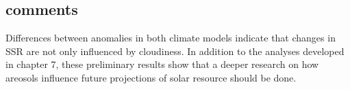 \begin{subappendices}
\section{comments}

Differences between anomalies in both climate models indicate that changes in SSR are not only influenced by cloudiness. In addition to the analyses developed in chapter 7, these preliminary results show that a deeper research on how areosols influence future projections of solar resource should be done.

\end{subappendices}

% 